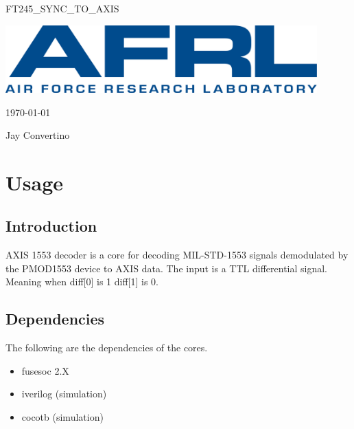 \begin{titlepage}
  \begin{center}

  {\Huge FT245\_SYNC\_TO\_AXIS}

  \vspace{25mm}

  \includegraphics[width=0.90\textwidth,height=\textheight,keepaspectratio]{img/AFRL.png}

  \vspace{25mm}

  \today

  \vspace{15mm}

  {\Large Jay Convertino}

  \end{center}
\end{titlepage}

\tableofcontents

\newpage

\section{Usage}

\subsection{Introduction}

\par
AXIS 1553 decoder is a core for decoding MIL-STD-1553 signals demodulated by the PMOD1553 device to AXIS data.
The input is a TTL differential signal. Meaning when diff[0] is 1 diff[1] is 0.

\subsection{Dependencies}

\par
The following are the dependencies of the cores.

\begin{itemize}
  \item fusesoc 2.X
  \item iverilog (simulation)
  \item cocotb (simulation)
\end{itemize}

